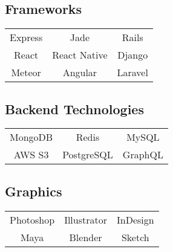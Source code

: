 \documentclass[letterpaper]{deedy-resume} %
\begin{document}
\begin{minipage}[t]{0.33\textwidth}
\vspace{4mm}

\subsection{Frameworks}

\begin{tabular}{ c c c }
  Express & Jade & Rails \\
  React & React Native & Django \\
  Meteor & Angular & Laravel
\end{tabular}

\vspace{4mm}

\subsection{Backend Technologies}

\begin{tabular}{ c c c }
  MongoDB & Redis & MySQL \\
  AWS S3 & PostgreSQL & GraphQL
\end{tabular}

\vspace{4mm}

\subsection{Graphics}

\begin{tabular}{ c c c }
  Photoshop & Illustrator & InDesign \\
  Maya & Blender & Sketch
\end{tabular}

\sectionspace %



\end{minipage} %
\hfill
%
%
\end{document}
